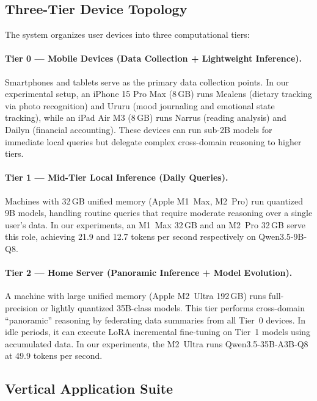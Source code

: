 \documentclass[11pt,a4paper]{article}
\newcommand{\appname}[1]{\textsf{#1}}
\begin{document}
\subsection{Three-Tier Device Topology}

The system organizes user devices into three computational tiers:

\paragraph{Tier 0 --- Mobile Devices (Data Collection + Lightweight Inference).}
Smartphones and tablets serve as the primary data collection points. In our
experimental setup, an iPhone 15 Pro Max (8\,GB) runs \appname{Mealens}
(dietary tracking via photo recognition) and \appname{Ururu} (mood journaling
and emotional state tracking), while an iPad Air M3 (8\,GB) runs
\appname{Narrus} (reading analysis) and \appname{Dailyn} (financial
accounting). These devices can run sub-2B models for immediate local queries
but delegate complex cross-domain reasoning to higher tiers.

\paragraph{Tier 1 --- Mid-Tier Local Inference (Daily Queries).}
Machines with 32\,GB unified memory (Apple M1~Max, M2~Pro) run quantized 9B
models, handling routine queries that require moderate reasoning over a single
user's data. In our experiments, an M1~Max 32\,GB and an M2~Pro 32\,GB serve
this role, achieving 21.9 and 12.7 tokens per second respectively on
Qwen3.5-9B-Q8.

\paragraph{Tier 2 --- Home Server (Panoramic Inference + Model Evolution).}
A machine with large unified memory (Apple M2~Ultra 192\,GB) runs
full-precision or lightly quantized 35B-class models. This tier performs
cross-domain ``panoramic'' reasoning by federating data summaries from all
Tier~0 devices. In idle periods, it can execute LoRA incremental fine-tuning
on Tier~1 models using accumulated data. In our experiments, the M2~Ultra runs
Qwen3.5-35B-A3B-Q8 at 49.9 tokens per second.

\subsection{Vertical Application Suite}
\end{document}
